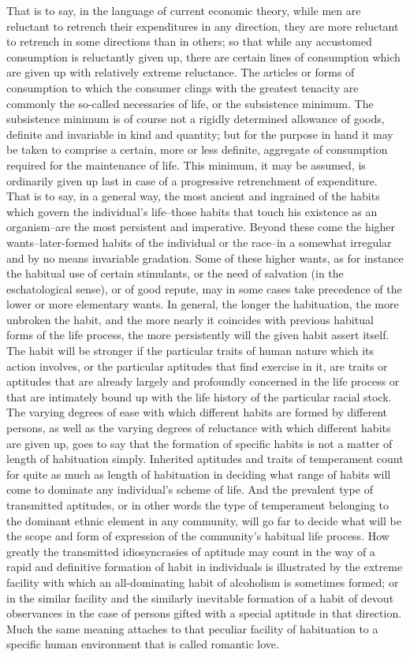 \documentclass[12pt]{report}
\begin{document}
That is to say, in the language of current economic theory, while men
are reluctant to retrench their expenditures in any direction, they are
more reluctant to retrench in some directions than in others; so that
while any accustomed consumption is reluctantly given up, there are
certain lines of consumption which are given up with relatively extreme
reluctance. The articles or forms of consumption to which the consumer
clings with the greatest tenacity are commonly the so-called necessaries
of life, or the subsistence minimum. The subsistence minimum is of
course not a rigidly determined allowance of goods, definite and
invariable in kind and quantity; but for the purpose in hand it may
be taken to comprise a certain, more or less definite, aggregate of
consumption required for the maintenance of life. This minimum, it
may be assumed, is ordinarily given up last in case of a progressive
retrenchment of expenditure. That is to say, in a general way, the
most ancient and ingrained of the habits which govern the individual's
life--those habits that touch his existence as an organism--are the
most persistent and imperative. Beyond these come the higher
wants--later-formed habits of the individual or the race--in a somewhat
irregular and by no means invariable gradation. Some of these higher
wants, as for instance the habitual use of certain stimulants, or the
need of salvation (in the eschatological sense), or of good repute, may
in some cases take precedence of the lower or more elementary wants. In
general, the longer the habituation, the more unbroken the habit, and
the more nearly it coincides with previous habitual forms of the life
process, the more persistently will the given habit assert itself. The
habit will be stronger if the particular traits of human nature which
its action involves, or the particular aptitudes that find exercise
in it, are traits or aptitudes that are already largely and profoundly
concerned in the life process or that are intimately bound up with the
life history of the particular racial stock. The varying degrees of ease
with which different habits are formed by different persons, as well as
the varying degrees of reluctance with which different habits are given
up, goes to say that the formation of specific habits is not a matter
of length of habituation simply. Inherited aptitudes and traits of
temperament count for quite as much as length of habituation in deciding
what range of habits will come to dominate any individual's scheme of
life. And the prevalent type of transmitted aptitudes, or in other words
the type of temperament belonging to the dominant ethnic element in
any community, will go far to decide what will be the scope and form
of expression of the community's habitual life process. How greatly the
transmitted idiosyncrasies of aptitude may count in the way of a rapid
and definitive formation of habit in individuals is illustrated by the
extreme facility with which an all-dominating habit of alcoholism
is sometimes formed; or in the similar facility and the similarly
inevitable formation of a habit of devout observances in the case of
persons gifted with a special aptitude in that direction. Much the same
meaning attaches to that peculiar facility of habituation to a specific
human environment that is called romantic love.
\end{document}
